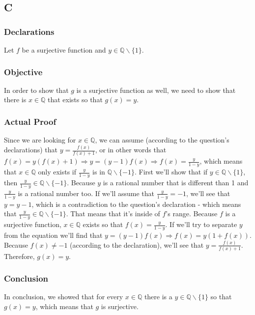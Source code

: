 \documentclass[12pt, oneside]{article}
\begin{document}
\subsection{C}
\setcounter{subsubsection}{-1}
\subsubsection{Declarations}
Let $f$ be a surjective function and $y \in \mathbb{Q}\backslash\{1\}$.

\subsubsection{Objective}
In order to show that $g$ is a surjective function as well, we need to show that there is $x \in \mathbb{Q}$ that exists so that $g(x) = y$.

\subsubsection{Actual Proof}
Since we are looking for $x \in \mathbb{Q}$, we can assume (according to the question's declarations) that $y = \frac{f(x)}{f(x) + 1}$, or in other words that $f(x) = y(f(x) + 1) \Rightarrow y = (y  - 1)f(x) \Rightarrow f(x) = \frac{y}{1 - y}$, which means that $x \in \mathbb{Q}$ only exists if $\frac{y}{1 - y}$ is in $\mathbb{Q}\backslash\{-1\}$. First we'll show that if $y \in \mathbb{Q}\backslash\{1\}$, then $\frac{y}{1 - y} \in \mathbb{Q}\backslash\{-1\}$. Because $y$ is a rational number that is different than 1 and $\frac{y}{1 - y}$ is a rational number too. If we'll assume that $\frac{y}{1 - y} = -1$, we'll see that $y = y - 1$, which is a contradiction to the question's declaration - which means that $\frac{y}{1 - y} \in \mathbb{Q}\backslash\{-1\}$. That means that it's inside of $f$'s range. Because $f$ is a surjective function, $x \in \mathbb{Q}$ exists so that $f(x) = \frac{y}{1 - y}$. If we'll try to separate $y$ from the equation we'll find that $y = (y - 1)f(x) \Rightarrow f(x) = y(1 + f(x))$. Because $f(x) \neq -1$ (according to the declaration), we'll see that $y = \frac{f(x)}{f(x) + 1}$. Therefore, $g(x) = y$.

\subsubsection{Conclusion}
In conclusion, we showed that for every $x \in \mathbb{Q}$ there is a $y \in \mathbb{Q}\backslash\{1\}$ so that $g(x) = y$, which means that $g$ is surjective.
\end{document}
